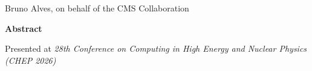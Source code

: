 \documentclass[11pt,a4paper]{article}
\newcommand{\CRAuthors}{Bruno Alves, on behalf of the CMS Collaboration}
\newcommand{\CRAbstract}{}
\newcommand{\CRConference}{28th Conference on Computing in High Energy and Nuclear Physics (CHEP 2026)}
\begin{document}
\begin{titlepage}
\vspace{5mm}
{\fontsize{10}{16}\selectfont \CRAuthors\par}

\vspace{8.5mm}
{\fontsize{10}{12}\selectfont\bfseries Abstract\par}
\vspace{2.5mm}
\begin{minipage}{0.86\textwidth}
\justifying
\fontsize{10}{12}\selectfont
\CRAbstract
\end{minipage}

\vspace{6mm}
\begin{minipage}{0.98\textwidth}
\raggedright
{\fontsize{10}{12}\selectfont Presented at \textit{\CRConference}\par}
\end{minipage}

\vfill
\end{titlepage}
\end{document}
